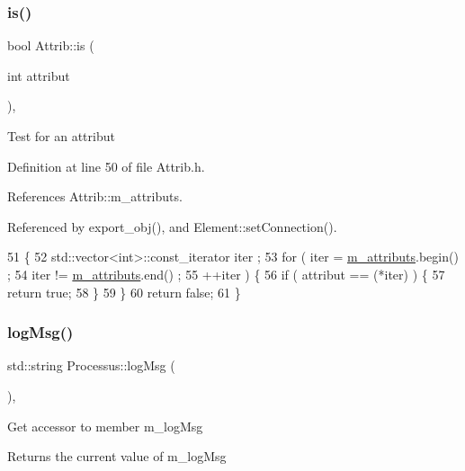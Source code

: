 \subsubsection{\texorpdfstring{is()}{is()}}
{\footnotesize\ttfamily bool Attrib\+::is (\begin{DoxyParamCaption}\item[{int}]{attribut }\end{DoxyParamCaption})\hspace{0.3cm}{\ttfamily [inline]}, {\ttfamily [inherited]}}

Test for an attribut 

Definition at line 50 of file Attrib.\+h.



References Attrib\+::m\+\_\+attributs.



Referenced by export\+\_\+obj(), and Element\+::set\+Connection().


\begin{DoxyCode}
51   \{
52     std::vector<int>::const\_iterator iter ;
53     \textcolor{keywordflow}{for} ( iter  = \hyperlink{classAttrib_ac4bd58a0cc6b38a3b711d609a3d3aacc}{m\_attributs}.begin() ;
54           iter != \hyperlink{classAttrib_ac4bd58a0cc6b38a3b711d609a3d3aacc}{m\_attributs}.end()   ;
55           ++iter ) \{
56       \textcolor{keywordflow}{if} ( attribut == (*iter) ) \{
57         \textcolor{keywordflow}{return} \textcolor{keyword}{true};
58       \}
59     \}
60     \textcolor{keywordflow}{return} \textcolor{keyword}{false};
61   \}
\end{DoxyCode}
\mbox{\label{classProcessus_a42fdeb17dc13ba854222666b6aa29b61}} 
\subsubsection{\texorpdfstring{log\+Msg()}{logMsg()}}
{\footnotesize\ttfamily std\+::string Processus\+::log\+Msg (\begin{DoxyParamCaption}{ }\end{DoxyParamCaption})\hspace{0.3cm}{\ttfamily [inline]}, {\ttfamily [inherited]}}

Get accessor to member m\+\_\+log\+Msg \begin{DoxyReturn}{Returns}
the current value of m\+\_\+log\+Msg 
\end{DoxyReturn}


